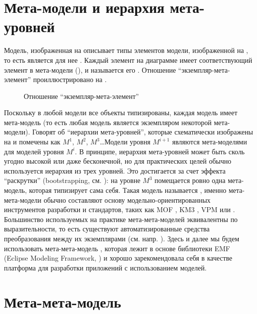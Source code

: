 \section{Мета-модели и иерархия мета-уровней}

Модель, изображенная на  описывает типы элементов модели, изображенной на , то есть является для нее . Каждый элемент на диаграмме  имеет соответствующий элемент в мета-модели (), и называется его . Отношение ``экземпляр-мета-элемент'' проиллюстрировано на .

\begin{figure}[htbp]
\caption{Отношение ``экземпляр-мета-элемент''}\label{ConformsToRelation}
\end{figure}

\newcommand{\MM}[1]{\mathcal{#1}}%

Поскольку в любой модели все объекты типизированы, каждая модель имеет мета-модель  (то есть любая модель является экземпляром некоторой мета-модели). Говорят об ``иерархии мета-уровней'', которые схематически изображены на   и помечены как $M^1$, $M^2$, $M^3$\ldots Модели уровня $M^{i+1}$ являются мета-моделями для моделей уровня $M^i$. В принципе, иерархия мета-уровней может быть сколь угодно высокой или даже бесконечной, но для практических целей обычно используется иерархия из трех уровней. Это достигается за счет эффекта ``раскрутки'' (bootstrapping, см. \cite{Wirth}): на уровне $M^3$ помещается ровно одна мета-модель, которая типизирует сама себя. Такая модель называется , именно мета-мета-модели обычно составляют основу модельно-ориентированных инструментов разработки и стандартов, таких как MOF \cite{MOF}, KM3 \cite{KM3}, VPM \cite{VPM} или  \cite{EMF}. Большинство используемых на практике мета-мета-моделей эквивалентны по выразительности, то есть существуют автоматизированные средства преобразования между их экземплярами (см. напр. \cite{KM3}). Здесь и далее мы будем использовать мета-мета-модель , которая лежит в основе библиотеки EMF (Eclipse Modeling Framework, \cite{EMF}) и хорошо зарекомендовала себя в качестве платформа для разработки приложений с использованием моделей.

\section{Мета-мета-модель }

